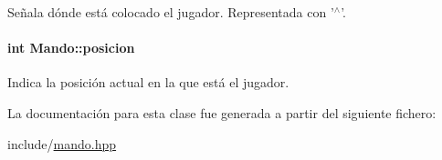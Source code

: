 Señala dónde está colocado el jugador. Representada con '$^\wedge$'. 

\hypertarget{classMando_a7971a6eaa8b936977be7460ffa28530f}{
\paragraph[{posicion}]{\setlength{\rightskip}{0pt plus 5cm}int Mando\-::posicion\hspace{0.3cm}{\ttfamily [private]}}}\label{classMando_a7971a6eaa8b936977be7460ffa28530f}


Indica la posición actual en la que está el jugador. 



La documentación para esta clase fue generada a partir del siguiente fichero\-:\begin{DoxyCompactItemize}
\item 
include/\hyperlink{mando_8hpp}{mando.\-hpp}\end{DoxyCompactItemize}
